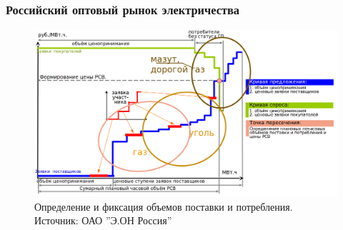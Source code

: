\documentclass[c, dvipsnames]{beamer}  %
\begin{document}
\begin{frame}[shrink=5]
\frametitle{Российский оптовый рынок электричества} 

\begin{figure}
\centering
\includegraphics[width=1\linewidth]{screenshot032}
\caption{ Определение и фиксация объемов поставки и потребления.  Источник: ОАО ''Э.ОН Россия'' }
\label{fig:screenshot015}
\end{figure}

\end{frame}
\end{document}
